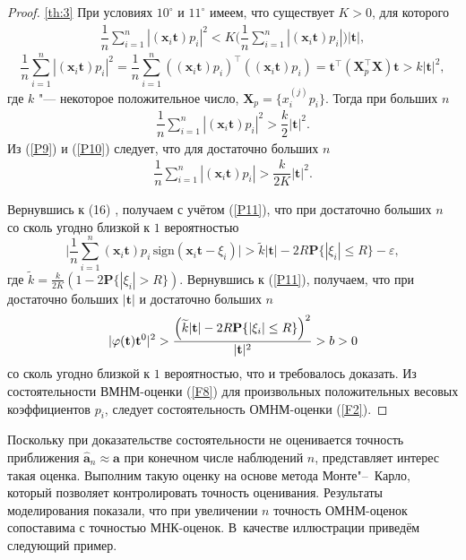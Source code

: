 \begin{proof}{\ref{th:3}}
При условиях $10^{\circ}$ и $11^{\circ}$ имеем, что существует
$K>0$, для которого
\begin{gather} \label{P9}
\dfrac 1n \sum_{i=1}^n |(\mathbf{x}_{i}\mathbf{t})p_{i}|^{2} <
K\biggl(\dfrac 1n \sum_{i=1}^n
|(\mathbf{x}_{i}\mathbf{t})p_{i}|\biggr)|\mathbf{t}|,
\end{gather}
$$\dfrac 1n \sum_{i=1}^n
|(\mathbf{x}_{i}\mathbf{t})p_{i}|^{2}=\dfrac 1n \sum_{i=1}^n
((\mathbf{x}_{i}\mathbf{t})p_{i})^{\top}((\mathbf{x}_{i}\mathbf{t})p_{i})
=\mathbf{t}^{\top}\left(\mathbf{X}_{p}^{\top}\mathbf{X}\right)\mathbf{t}
> k|\mathbf{t}|^{2},$$ где $k$ "--- некоторое положительное число, $\mathbf{X}_{p}=\{x_{i}^{(j)}p_{i}\}$. 
Тогда при 
 больших $n$
\begin{gather} \label{P10}
\dfrac 1n \sum_{i=1}^n |(\mathbf{x}_{i}\mathbf{t})p_{i}|^{2} >
\dfrac k2|\mathbf{t}|^{2}.
\end{gather}
Из (\ref{P9}) и (\ref{P10}) следует, что для достаточно
больших $n$
\begin{gather} \label{P11}
\dfrac 1n \sum_{i=1}^n |(\mathbf{x}_{i}\mathbf{t})p_{i}| >
\dfrac{k}{2K}|\mathbf{t}|^{2}.
\end{gather}

Вернувшись к (16)%
, получаем с учётом (\ref{P11}), что при достаточно больших $n$ со сколь угодно близкой к $1$ вероятностью
$$\biggl| \dfrac 1n \sum_{i=1}^n (\mathbf{x}_{i}\mathbf{t})p_{i} \,
\mathrm{sign}\left(\mathbf{x}_{i}\mathbf{t}-\xi_{i}\right)\biggr|
> \widetilde{k}|\mathbf{t}| - 2R\mathbf{P}\{ |\xi_{i}|\leq R \} -
\varepsilon,$$ 
где 
$\widetilde{k} = \frac{k}{2K}\left(
1-2\mathbf{P}\{|\xi_{i}|>R\} \right)$. Вернувшись к (\ref{P11}),
получаем, что при достаточно больших $|\mathbf{t}|$ и достаточно
больших $n$
$$|\mathbf{\varphi}(\mathbf{t})\mathbf{t}^{0}|^{2}>\dfrac{\Bigl(\widetilde{k}|\mathbf{t}|-2R\mathbf{P}\{|\xi_{i}|\leq
R\}\Bigr)^{2}}{|\mathbf{t}|^{2}}>b>0$$ со сколь угодно близкой к
$1$ вероятностью, что и требовалось доказать. Из состоятельности
ВМНМ-оценки (\ref{F8}) для произвольных положительных весовых
коэффициентов $p_{i}$,
следует состоятельность
ОМНМ-оценки (\ref{F2}).
\end{proof}

\smallskip

Поскольку при доказательстве состоятельности не оценивается точность приближения \mbox{$\mathbf{\hat{a}}_{n} \approx \mathbf{a}$} при
конечном числе наблюдений $n$, представляет интерес такая оценка. 
Выполним такую оценку на основе метода Монте"--~Карло, который позволяет контролировать точность оценивания. 
Результаты моделирования показали, что при увеличении $n$ точность ОМНМ-оценок сопоставима с точностью МНК-оценок. 
В~качестве иллюстрации приведём следующий пример.




